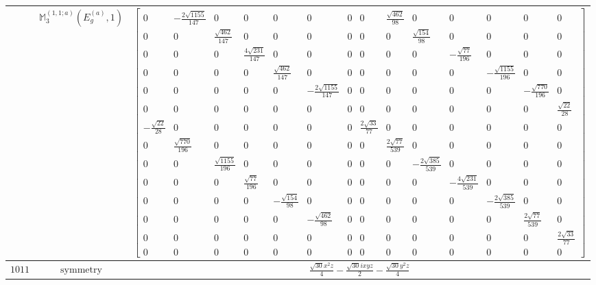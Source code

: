 \documentclass[fleqn,8pt,landscape]{jsarticle}
\begin{document}
\begin{longtable}{ccc}
$  $ & $ \mathbb{M}_{3}^{(1,1;a)}(E_{g}^{(a)},1) $ & $ \begin{bmatrix} 0 & - \frac{2 \sqrt{1155}}{147} & 0 & 0 & 0 & 0 & 0 & 0 & \frac{\sqrt{462}}{98} & 0 & 0 & 0 & 0 & 0 \\ 0 & 0 & \frac{\sqrt{462}}{147} & 0 & 0 & 0 & 0 & 0 & 0 & \frac{\sqrt{154}}{98} & 0 & 0 & 0 & 0 \\ 0 & 0 & 0 & \frac{4 \sqrt{231}}{147} & 0 & 0 & 0 & 0 & 0 & 0 & - \frac{\sqrt{77}}{196} & 0 & 0 & 0 \\ 0 & 0 & 0 & 0 & \frac{\sqrt{462}}{147} & 0 & 0 & 0 & 0 & 0 & 0 & - \frac{\sqrt{1155}}{196} & 0 & 0 \\ 0 & 0 & 0 & 0 & 0 & - \frac{2 \sqrt{1155}}{147} & 0 & 0 & 0 & 0 & 0 & 0 & - \frac{\sqrt{770}}{196} & 0 \\ 0 & 0 & 0 & 0 & 0 & 0 & 0 & 0 & 0 & 0 & 0 & 0 & 0 & \frac{\sqrt{22}}{28} \\ - \frac{\sqrt{22}}{28} & 0 & 0 & 0 & 0 & 0 & 0 & \frac{2 \sqrt{33}}{77} & 0 & 0 & 0 & 0 & 0 & 0 \\ 0 & \frac{\sqrt{770}}{196} & 0 & 0 & 0 & 0 & 0 & 0 & \frac{2 \sqrt{77}}{539} & 0 & 0 & 0 & 0 & 0 \\ 0 & 0 & \frac{\sqrt{1155}}{196} & 0 & 0 & 0 & 0 & 0 & 0 & - \frac{2 \sqrt{385}}{539} & 0 & 0 & 0 & 0 \\ 0 & 0 & 0 & \frac{\sqrt{77}}{196} & 0 & 0 & 0 & 0 & 0 & 0 & - \frac{4 \sqrt{231}}{539} & 0 & 0 & 0 \\ 0 & 0 & 0 & 0 & - \frac{\sqrt{154}}{98} & 0 & 0 & 0 & 0 & 0 & 0 & - \frac{2 \sqrt{385}}{539} & 0 & 0 \\ 0 & 0 & 0 & 0 & 0 & - \frac{\sqrt{462}}{98} & 0 & 0 & 0 & 0 & 0 & 0 & \frac{2 \sqrt{77}}{539} & 0 \\ 0 & 0 & 0 & 0 & 0 & 0 & 0 & 0 & 0 & 0 & 0 & 0 & 0 & \frac{2 \sqrt{33}}{77} \\ 0 & 0 & 0 & 0 & 0 & 0 & 0 & 0 & 0 & 0 & 0 & 0 & 0 & 0 \end{bmatrix} $ \\ \hline
$ 1011 $ & $ \text{symmetry} $ & $ \frac{\sqrt{30} x^{2} z}{4} - \frac{\sqrt{30} i x y z}{2} - \frac{\sqrt{30} y^{2} z}{4} $ \\

\end{longtable}
\end{document}
